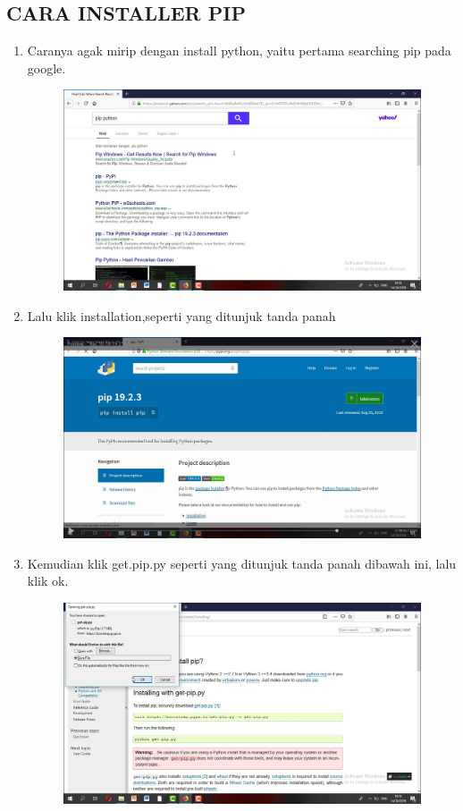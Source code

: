 \begin{enumerate}
\section*{CARA INSTALLER PIP}
\begin{enumerate}
\item  Caranya agak mirip dengan install python, yaitu pertama searching pip pada google.
\begin{figure}[h]
    \centering
    \includegraphics[scale=0.2]{gambar/11.png}
    \caption{}
    \label{fig:my_label}
\end{figure}
\item  Lalu klik installation,seperti yang ditunjuk tanda panah
\begin{figure}[h]
    \centering
    \includegraphics[scale=0.2]{gambar/12.png}
    \caption{}
    \label{fig:my_label}
\end{figure}
\item  Kemudian klik get.pip.py seperti yang ditunjuk tanda panah dibawah ini, lalu klik ok.
\begin{figure}[h]
    \centering
    \includegraphics[scale=0.2]{gambar/13.png}

\end{figure}
\end{enumerate}
\end{enumerate}
